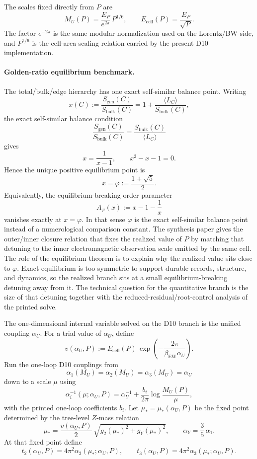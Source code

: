 \documentclass[11pt]{article}
\begin{document}
The scales fixed directly from \(P\) are
\[
M_U(P)=\frac{E_P}{e^{2\pi}}\,P^{1/6},
\qquad
E_{\mathrm{cell}}(P)=\frac{E_P}{\sqrt P}.
\]
The factor \(e^{-2\pi}\) is the same modular normalization used on the Lorentz/BW side, and \(P^{1/6}\) is the cell-area scaling relation carried by the present D10 implementation.

\paragraph{Golden-ratio equilibrium benchmark.}
The total/bulk/edge hierarchy has one exact self-similar balance point. Writing
\[
x(C):=\frac{S_{\mathrm{gen}}(C)}{S_{\mathrm{bulk}}(C)}
=
1+\frac{\langle L_C\rangle}{S_{\mathrm{bulk}}(C)},
\]
the exact self-similar balance condition
\[
\frac{S_{\mathrm{gen}}(C)}{S_{\mathrm{bulk}}(C)}
=
\frac{S_{\mathrm{bulk}}(C)}{\langle L_C\rangle}
\]
gives
\[
x=\frac{1}{x-1},
\qquad
x^2-x-1=0.
\]
Hence the unique positive equilibrium point is
\[
x=\varphi:=\frac{1+\sqrt5}{2}.
\]
Equivalently, the equilibrium-breaking order parameter
\[
A_\varphi(x):=x-1-\frac1x
\]
vanishes exactly at \(x=\varphi\). In that sense \(\varphi\) is the exact self-similar balance
point instead of a numerological comparison constant. The synthesis paper gives the outer/inner
closure relation that fixes the realized value of \(P\) by matching that detuning to the inner
electromagnetic observation scale emitted by the same cell. The role of the equilibrium theorem is
to explain why the realized value sits close to \(\varphi\). Exact equilibrium is too symmetric to
support durable records, structure, and dynamics, so the realized branch sits at a small
equilibrium-breaking detuning away from it. The technical question for the quantitative branch is
the size of that detuning together with the reduced-residual/root-control analysis of the printed
solve.

The one-dimensional internal variable solved on the D10 branch is the unified coupling \(\alpha_U\). For a trial value of \(\alpha_U\), define
\[
v(\alpha_U,P)
:=
E_{\mathrm{cell}}(P)\,
\exp\!\left(-\frac{2\pi}{\beta_{\mathrm{EW}}\alpha_U}\right).
\]
Run the one-loop D10 couplings from
\[
\alpha_1(M_U)=\alpha_2(M_U)=\alpha_3(M_U)=\alpha_U
\]
down to a scale \(\mu\) using
\[
\alpha_i^{-1}(\mu;\alpha_U,P)
=
\alpha_U^{-1}
+
\frac{b_i}{2\pi}\log\frac{M_U(P)}{\mu},
\]
with the printed one-loop coefficients \(b_i\). Let \(\mu_\ast=\mu_\ast(\alpha_U,P)\) be the fixed point determined by the tree-level \(Z\)-mass relation
\[
\mu_\ast
=
\frac{v(\alpha_U,P)}{2}\,
\sqrt{g_2(\mu_\ast)^2+g_Y(\mu_\ast)^2},
\qquad
\alpha_Y=\frac35\,\alpha_1.
\]
At that fixed point define
\[
t_2(\alpha_U,P)=4\pi^2\alpha_2(\mu_\ast;\alpha_U,P),
\qquad
t_3(\alpha_U,P)=4\pi^2\alpha_3(\mu_\ast;\alpha_U,P).
\]
\end{document}
